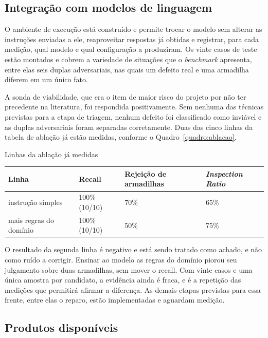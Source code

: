 \documentclass[article,12pt,oneside,a4paper,english,brazil]{abntex2}
\begin{document}
\subsection{Integração com modelos de linguagem}

O ambiente de execução está construído e permite trocar o modelo sem alterar as
instruções enviadas a ele, reaproveitar respostas já obtidas e registrar, para
cada medição, qual modelo e qual configuração a produziram. Os vinte casos de
teste estão montados e cobrem a variedade de situações que o \textit{benchmark}
apresenta, entre elas seis duplas adversariais, nas quais um defeito real e uma
armadilha diferem em um único fato.

A sonda de viabilidade, que era o item de maior risco do projeto por não ter
precedente na literatura, foi respondida positivamente. Sem nenhuma das técnicas
previstas para a etapa de triagem, nenhum defeito foi classificado como inviável
e as duplas adversariais foram separadas corretamente. Duas das cinco linhas da
tabela de ablação já estão medidas, conforme o Quadro~\ref{quadro:ablacao}.

\begin{quadro}[htb]
  \caption{\label{quadro:ablacao}Linhas da ablação já medidas}
  \small
  \begin{tabular}{|l|L{2.6cm}|L{2.8cm}|L{3.0cm}|}
    \hline
    Linha & Recall & Rejeição de armadilhas & \textit{Inspection Ratio} \\
    \hline
    instrução simples & 100\% (10/10) & 70\% & 65\% \\
    \hline
    mais regras do domínio & 100\% (10/10) & 50\% & 75\% \\
    \hline
  \end{tabular}
\end{quadro}

O resultado da segunda linha é negativo e está sendo tratado como achado, e não
como ruído a corrigir. Ensinar ao modelo as regras do domínio piorou seu
julgamento sobre duas armadilhas, sem mover o recall. Com vinte casos e uma
única amostra por candidato, a evidência ainda é fraca, e é a repetição das
medições que permitirá afirmar a diferença. As demais etapas previstas para essa
frente, entre elas o reparo, estão implementadas e aguardam medição.

\subsection{Produtos disponíveis}
\end{document}
